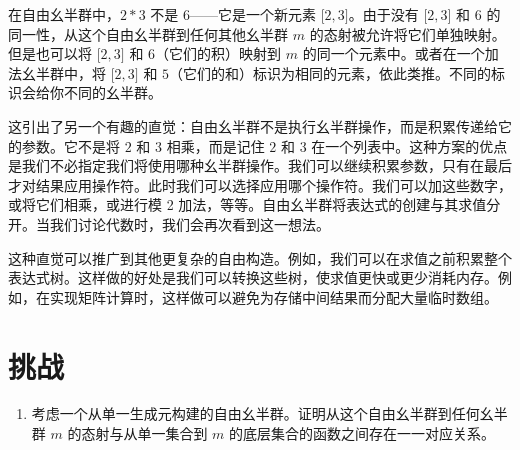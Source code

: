 在自由幺半群中，$2 * 3$ 不是 $6$——它是一个新元素 ${[}2, 3{]}$。由于没有 ${[}2, 3{]}$ 和 $6$ 的同一性，从这个自由幺半群到任何其他幺半群 $m$ 的态射被允许将它们单独映射。但是也可以将 ${[}2, 3{]}$ 和 $6$（它们的积）映射到 $m$ 的同一个元素中。或者在一个加法幺半群中，将 ${[}2, 3{]}$ 和 $5$（它们的和）标识为相同的元素，依此类推。不同的标识会给你不同的幺半群。

这引出了另一个有趣的直觉：自由幺半群不是执行幺半群操作，而是积累传递给它的参数。它不是将 $2$ 和 $3$ 相乘，而是记住 $2$ 和 $3$ 在一个列表中。这种方案的优点是我们不必指定我们将使用哪种幺半群操作。我们可以继续积累参数，只有在最后才对结果应用操作符。此时我们可以选择应用哪个操作符。我们可以加这些数字，或将它们相乘，或进行模 2 加法，等等。自由幺半群将表达式的创建与其求值分开。当我们讨论代数时，我们会再次看到这一想法。

这种直觉可以推广到其他更复杂的自由构造。例如，我们可以在求值之前积累整个表达式树。这样做的好处是我们可以转换这些树，使求值更快或更少消耗内存。例如，在实现矩阵计算时，这样做可以避免为存储中间结果而分配大量临时数组。

\section{挑战}

\begin{enumerate}
  \tightlist
  \item
  考虑一个从单一生成元构建的自由幺半群。证明从这个自由幺半群到任何幺半群 $m$ 的态射与从单一集合到 $m$ 的底层集合的函数之间存在一一对应关系。
\end{enumerate}
